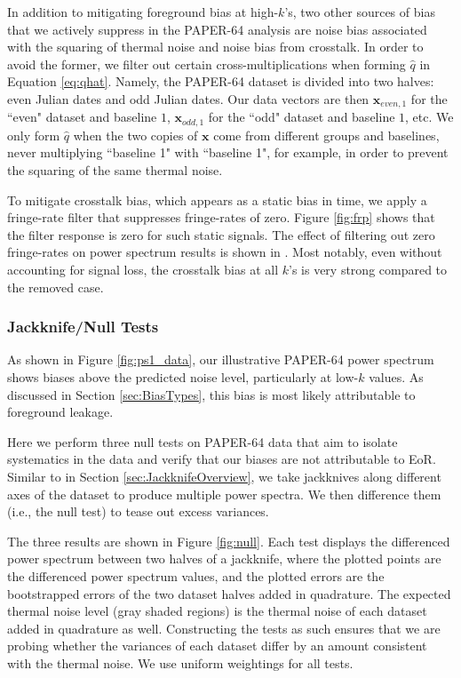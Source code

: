 \documentclass[preprint2,numberedappendix,tighten]{aastex6}  %
\begin{document}
In addition to mitigating foreground bias at high-$k$'s, two other sources of bias that we actively suppress in the PAPER-64 
analysis are noise bias associated with the squaring of thermal noise and noise bias from crosstalk. In order to avoid the 
former, we filter out certain cross-multiplications when forming $\widehat{q}$ in Equation \eqref{eq:qhat}. Namely, the PAPER-64 
dataset is divided into two halves: even Julian dates and odd Julian dates. Our data vectors are then $\textbf{x}_{even, 1}$ for 
the ``even" dataset and baseline $1$, $\textbf{x}_{odd, 1}$ for the ``odd" dataset and baseline $1$, etc. We only form 
$\widehat{q}$ when the two copies of $\textbf{x}$ come from different groups and baselines, never multiplying ``baseline 1" with ``baseline 1", for 
example, in order to prevent the squaring of the same thermal noise. 

To mitigate crosstalk bias, which appears as a static bias in time, we apply a fringe-rate filter that suppresses fringe-rates of 
zero. Figure \ref{fig:frp} shows that the filter response is zero for such static signals. The effect of filtering out zero fringe-rates 
on power spectrum results is shown in . Most notably, even without accounting for signal loss, the crosstalk bias at all $k$'s is very strong compared to the removed case.

\subsubsection{Jackknife/Null Tests}

As shown in Figure \ref{fig:ps1_data}, our illustrative PAPER-64 power spectrum shows biases above the predicted noise level, particularly at low-$k$ values. As discussed in Section \ref{sec:BiasTypes}, this bias is
most likely attributable to foreground leakage. %

Here we perform three null tests on PAPER-64 data that aim to isolate systematics in the data and verify 
that our biases are not attributable to EoR. Similar to in Section \ref{sec:JackknifeOverview}, we take jackknives along different axes of the dataset to produce multiple power spectra. We then difference them (i.e., the null test) to tease out excess variances.

The three results are shown in Figure \ref{fig:null}. Each test displays the differenced power spectrum between two halves of a jackknife, where the plotted points are the differenced power spectrum values, and the plotted errors are the bootstrapped errors of the two dataset halves added in quadrature. The expected thermal noise level (gray shaded regions) is the thermal noise of each dataset added in quadrature as well. Constructing the tests as such ensures that we are probing whether the variances of each dataset differ by an amount consistent with the thermal noise. We use uniform weightings for all tests. 
\end{document}
